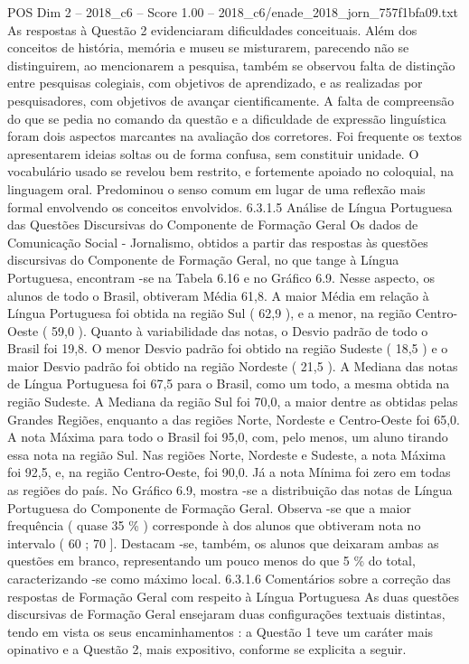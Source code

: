 \begin{textsample}{POS Dim 2 – 2018\_c6 – Score 1.00 – 2018\_c6/enade\_2018\_jorn\_757f1bfa09.txt}
As respostas à Questão 2 evidenciaram dificuldades conceituais.
Além dos conceitos de história, memória e museu se misturarem, parecendo não se distinguirem, ao mencionarem a pesquisa, também se observou falta de distinção entre pesquisas colegiais, com objetivos de aprendizado, e as realizadas por pesquisadores, com objetivos de avançar cientificamente.
A falta de compreensão do que se pedia no comando da questão e a dificuldade de expressão linguística foram dois aspectos marcantes na avaliação dos corretores.
Foi frequente os textos apresentarem ideias soltas ou de forma confusa, sem constituir unidade.
O vocabulário usado se revelou bem restrito, e fortemente apoiado no coloquial, na linguagem oral.
Predominou o senso comum em lugar de uma reflexão mais formal envolvendo os conceitos envolvidos. 6.3.1.5 Análise de Língua Portuguesa das Questões Discursivas do Componente de Formação Geral Os dados de Comunicação Social - Jornalismo, obtidos a partir das respostas às questões discursivas do Componente de Formação Geral, no que tange à Língua Portuguesa, encontram -se na Tabela 6.16 e no Gráfico 6.9.
Nesse aspecto, os alunos de todo o Brasil, obtiveram Média 61,8.
A maior Média em relação à Língua Portuguesa foi obtida na região Sul ( 62,9 ), e a menor, na região Centro-Oeste ( 59,0 ).
Quanto à variabilidade das notas, o Desvio padrão de todo o Brasil foi 19,8.
O menor Desvio padrão foi obtido na região Sudeste ( 18,5 ) e o maior Desvio padrão foi obtido na região Nordeste ( 21,5 ).
A Mediana das notas de Língua Portuguesa foi 67,5 para o Brasil, como um todo, a mesma obtida na região Sudeste.
A Mediana da região Sul foi 70,0, a maior dentre as obtidas pelas Grandes Regiões, enquanto a das regiões Norte, Nordeste e Centro-Oeste foi 65,0.
A nota Máxima para todo o Brasil foi 95,0, com, pelo menos, um aluno tirando essa nota na região Sul.
Nas regiões Norte, Nordeste e Sudeste, a nota Máxima foi 92,5, e, na região Centro-Oeste, foi 90,0.
Já a nota Mínima foi zero em todas as regiões do país.
No Gráfico 6.9, mostra -se a distribuição das notas de Língua Portuguesa do Componente de Formação Geral.
Observa -se que a maior frequência ( quase 35 \% ) corresponde à dos alunos que obtiveram nota no intervalo ( 60 ; 70 ].
Destacam -se, também, os alunos que deixaram ambas as questões em branco, representando um pouco menos do que 5 \% do total, caracterizando -se como máximo local. 6.3.1.6 Comentários sobre a correção das respostas de Formação Geral com respeito à Língua Portuguesa As duas questões discursivas de Formação Geral ensejaram duas configurações textuais distintas, tendo em vista os seus encaminhamentos : a Questão 1 teve um caráter mais opinativo e a Questão 2, mais expositivo, conforme se explicita a seguir.

\end{textsample}
